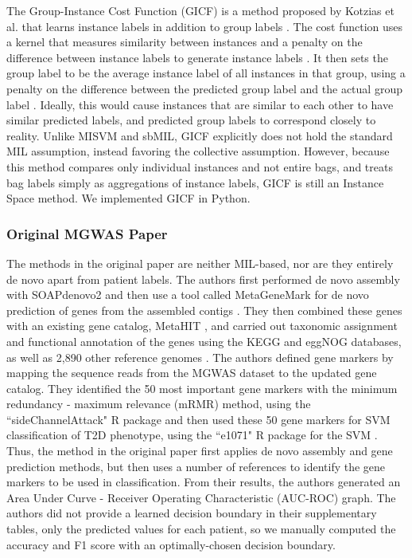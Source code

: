 The Group-Instance Cost Function (GICF) is a method proposed by Kotzias et al. that learns instance labels in addition to group labels \cite{kotzias15}. The cost function uses a kernel that measures similarity between instances and a penalty on the difference between instance labels to generate instance labels \cite{kotzias15}. It then sets the group label to be the average instance label of all instances in that group, using a penalty on the difference between the predicted group label and the actual group label \cite{kotzias15}. Ideally, this would cause instances that are similar to each other to have similar predicted labels, and predicted group labels to correspond closely to reality. Unlike MISVM and sbMIL, GICF explicitly does not hold the standard MIL assumption, instead favoring the collective assumption. However, because this method compares only individual instances and not entire bags, and treats bag labels simply as aggregations of instance labels, GICF is still an Instance Space method. We implemented GICF in Python.

\subsubsection{Original MGWAS Paper}

The methods in the original paper are neither MIL-based, nor are they entirely de novo apart from patient labels. The authors first performed de novo assembly with SOAPdenovo2 \cite{luo12} and then use a tool called MetaGeneMark \cite{zhu10, besemer99} for de novo prediction of genes from the assembled contigs \cite{qin041012}. They then combined these genes with an existing gene catalog, MetaHIT \cite{qin030410}, and carried out taxonomic assignment and functional annotation of the genes using the KEGG \cite{kanehisa00} and eggNOG \cite{powell12} databases, as well as 2,890 other reference genomes \cite{qin041012}. The authors defined gene markers by mapping the sequence reads from the MGWAS dataset to the updated gene catalog. They identified the 50 most important gene markers with the minimum redundancy - maximum relevance (mRMR) \cite{peng05} method, using the ``sideChannelAttack" R package and then used these 50 gene markers for SVM classification of T2D phenotype, using the ``e1071" R package for the SVM \cite{qin041012}. Thus, the method in the original paper first applies de novo assembly and gene prediction methods, but then uses a number of references to identify the gene markers to be used in classification. From their results, the authors generated an Area Under Curve - Receiver Operating Characteristic (AUC-ROC) graph. The authors did not provide a learned decision boundary in their supplementary tables, only the predicted values for each patient, so we manually computed the accuracy and F1 score with an optimally-chosen decision boundary. 

